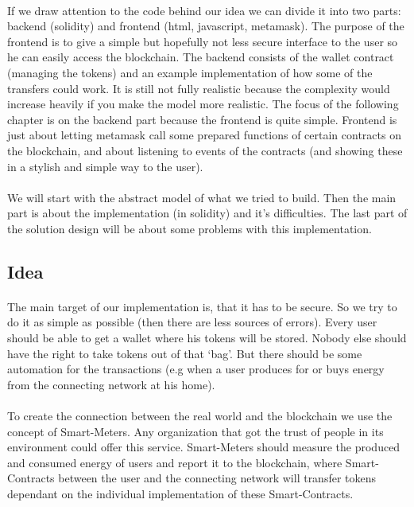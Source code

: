 \documentclass{scrartcl}
\begin{document}
   \paragraph{}
   If we draw attention to the code behind our idea we can divide it into two parts: backend (solidity) and frontend (html, javascript, metamask). The purpose of the frontend is to give a simple but hopefully not less secure interface to the user so he can easily access the blockchain. The backend consists of the wallet contract (managing the tokens) and an example implementation of how some of the transfers could work. It is still not fully realistic because the complexity would increase heavily if you make the model more realistic. The focus of the following chapter is on the backend part because the frontend is quite simple. Frontend is just about letting metamask call some prepared functions of certain contracts on the blockchain, and about listening to events of the contracts (and showing these in a stylish and simple way to the user).
   
   \paragraph{}
   We will start with the abstract model of what we tried to build. Then the main part is about the implementation (in solidity) and it’s difficulties. The last part of the solution design will be about some problems with this implementation.
   
   \subsection{Idea}
   
   \paragraph{}
   The main target of our implementation is, that it has to be secure. So we try to do it as simple as possible (then there are less sources of errors). Every user should be able to get a wallet where his tokens will be stored. Nobody else should have the right to take tokens out of that ‘bag’. But there should be some automation for the transactions (e.g when a user produces for or buys energy from the connecting network at his home).
	
	\paragraph{}
	To create the connection between the real world and the blockchain we use the concept of Smart-Meters. Any organization that got the trust of people in its environment could offer this service. Smart-Meters should measure the produced and consumed energy of users and report it to the blockchain, where Smart-Contracts between the user and the connecting network will transfer tokens dependant on the individual implementation of these Smart-Contracts.
	
\end{document}
